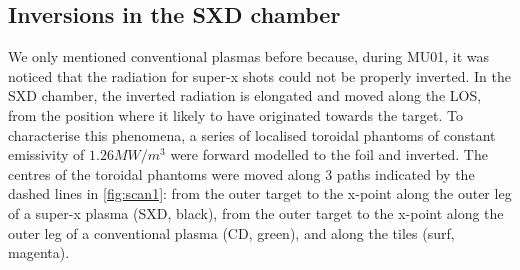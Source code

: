 \subsection{Inversions in the SXD chamber}\label{Inversions in the SXD}

We only mentioned conventional plasmas before because, during MU01, it was noticed that the radiation for super-x shots could not be properly inverted. In the SXD chamber, the inverted radiation is elongated and moved along the LOS, from the position where it likely to have originated towards the target. To characterise this phenomena, a series of localised toroidal phantoms of constant emissivity of $1.26MW/m^3$ were forward modelled to the foil and inverted. The centres of the toroidal phantoms were moved along 3 paths indicated by the dashed lines in \autoref{fig:scan1}: from the outer target to the x-point along the outer leg of a super-x plasma (SXD, black), from the outer target to the x-point along the outer leg of a conventional plasma (CD, green), and along the tiles (surf, magenta). 
